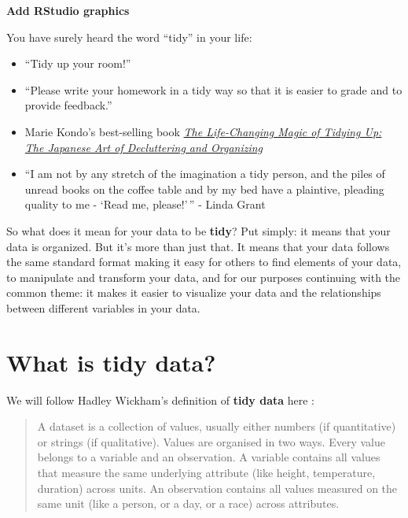 \documentclass[]{tufte-book}
\providecommand{\tightlist}{%
  \setlength{\itemsep}{0pt}\setlength{\parskip}{0pt}}
\begin{document}
\textbf{Add RStudio graphics}

You have surely heard the word ``tidy'' in your life:

\begin{itemize}
\tightlist
\item
  ``Tidy up your room!''
\item
  ``Please write your homework in a tidy way so that it is easier to
  grade and to provide feedback.''
\item
  Marie Kondo's best-selling book
  \href{https://www.amazon.com/Life-Changing-Magic-Tidying-Decluttering-Organizing/dp/1607747308/ref=sr_1_1?ie=UTF8\&qid=1469400636\&sr=8-1\&keywords=tidying+up}{\emph{The
  Life-Changing Magic of Tidying Up: The Japanese Art of Decluttering
  and Organizing}}
\item
  ``I am not by any stretch of the imagination a tidy person, and the
  piles of unread books on the coffee table and by my bed have a
  plaintive, pleading quality to me - `Read me, please!'\,'' - Linda
  Grant
\end{itemize}

So what does it mean for your data to be \textbf{tidy}? Put simply: it
means that your data is organized. But it's more than just that. It
means that your data follows the same standard format making it easy for
others to find elements of your data, to manipulate and transform your
data, and for our purposes continuing with the common theme: it makes it
easier to visualize your data and the relationships between different
variables in your data.

\section{What is tidy data?}\label{what-is-tidy-data}

We will follow Hadley Wickham's definition of \textbf{tidy data} here
\citep{tidy}:

\begin{quote}
A dataset is a collection of values, usually either numbers (if
quantitative) or strings (if qualitative). Values are organised in two
ways. Every value belongs to a variable and an observation. A variable
contains all values that measure the same underlying attribute (like
height, temperature, duration) across units. An observation contains all
values measured on the same unit (like a person, or a day, or a race)
across attributes.
\end{quote}
\end{document}
